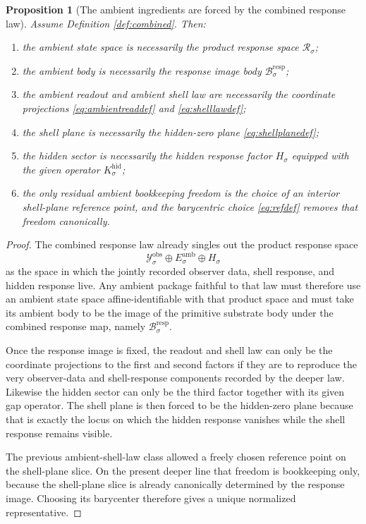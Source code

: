 \documentclass[11pt]{article}
\newcommand{\DataSpace}[1]{\mathcal Y_{#1}^{\mathrm{obs}}}
\newcommand{\HiddenOperator}[1]{K_{#1}^{\mathrm{hid}}}
\newcommand{\AmbientTarget}[1]{E_{#1}^{\mathrm{amb}}}
\newcommand{\ResponseSpace}[1]{\mathcal R_{#1}}
\newcommand{\ResponseImage}[1]{\mathcal B_{#1}^{\mathrm{resp}}}
\newcommand{\GapSpace}[1]{H_{#1}}
\newtheorem{proposition}{Proposition}
\begin{document}
\begin{proposition}[The ambient ingredients are forced by the combined response law]
\label{prop:forced}
Assume Definition \ref{def:combined}. Then:
\begin{enumerate}
    \item the ambient state space is necessarily the product response space \(\ResponseSpace{\sigma}\);
    \item the ambient body is necessarily the response image body \(\ResponseImage{\sigma}\);
    \item the ambient readout and ambient shell law are necessarily the coordinate projections \eqref{eq:ambientreaddef} and \eqref{eq:shelllawdef};
    \item the shell plane is necessarily the hidden-zero plane \eqref{eq:shellplanedef};
    \item the hidden sector is necessarily the hidden response factor \(\GapSpace{\sigma}\) equipped with the given operator \(\HiddenOperator{\sigma}\);
    \item the only residual ambient bookkeeping freedom is the choice of an interior shell-plane reference point, and the barycentric choice \eqref{eq:refdef} removes that freedom canonically.
\end{enumerate}
\end{proposition}

\begin{proof}
The combined response law already singles out the product response space
\[
\DataSpace{\sigma}\oplus \AmbientTarget{\sigma}\oplus \GapSpace{\sigma}
\]
as the space in which the jointly recorded observer data, shell response, and hidden response live. Any ambient package faithful to that law must therefore use an ambient state space affine-identifiable with that product space and must take its ambient body to be the image of the primitive substrate body under the combined response map, namely \(\ResponseImage{\sigma}\).

Once the response image is fixed, the readout and shell law can only be the coordinate projections to the first and second factors if they are to reproduce the very observer-data and shell-response components recorded by the deeper law. Likewise the hidden sector can only be the third factor together with its given gap operator. The shell plane is then forced to be the hidden-zero plane because that is exactly the locus on which the hidden response vanishes while the shell response remains visible.

The previous ambient-shell-law class allowed a freely chosen reference point on the shell-plane slice. On the present deeper line that freedom is bookkeeping only, because the shell-plane slice is already canonically determined by the response image. Choosing its barycenter therefore gives a unique normalized representative.
\end{proof}
\end{document}
